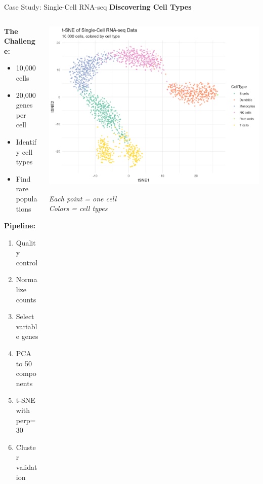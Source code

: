 \documentclass[10pt]{beamer}
\newcommand{\emphtext}[1]{\textcolor{upcblue}{\textbf{#1}}}
\begin{document}
\begin{frame}{Case Study: Single-Cell RNA-seq}
\emphtext{Discovering Cell Types}

\vspace{0.3cm}
\begin{columns}[T]
\begin{column}{0.48\textwidth}
\textbf{The Challenge:}
\begin{itemize}
\footnotesize
\item 10,000 cells
\item 20,000 genes per cell
\item Identify cell types
\item Find rare populations
\end{itemize}

\vspace{0.3cm}
\textbf{Pipeline:}
\begin{enumerate}
\footnotesize
\item Quality control
\item Normalize counts
\item Select variable genes
\item PCA to 50 components
\item t-SNE with perp=30
\item Cluster validation
\end{enumerate}
\end{column}

\begin{column}{0.48\textwidth}
\begin{center}
\includegraphics[width=\linewidth]{./Figures/scrna_tsne.png}
\end{center}
\footnotesize\textit{Each point = one cell\\
Colors = cell types}
\end{column}
\end{columns}


\end{frame}
\end{document}
